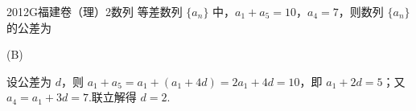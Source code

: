 
\begin{problem}{2012}{G}{福建卷（理）}{2}{数列}
等差数列 $ \{a_n\} $ 中，$ a_1 + a_5 = 10 $，$ a_4 = 7 $，则数列 $ \{a_n\} $ 的公差为
\begin{choices}
\end{choices}
\end{problem}

\begin{answer}
(B)
\end{answer}

\begin{solutions}
设公差为 $ d $，则 $ a_1 + a_5 = a_1 + (a_1 + 4d) = 2a_1 + 4d = 10 $，即 $ a_1 + 2d = 5 $；又 $ a_4 = a_1 + 3d = 7 $.联立解得 $ d = 2 $.
\end{solutions}